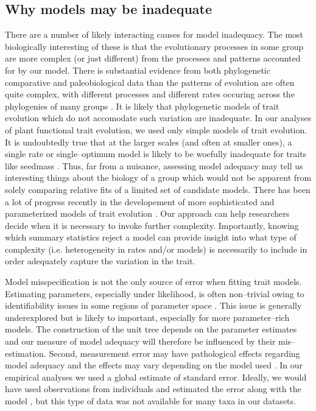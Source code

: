 \documentclass[a4paper,12pt]{article}
\begin{document}
\subsection*{Why models may be inadequate}
There are a number of likely interacting causes for model inadequacy. The most biologically interesting of these is that the evolutionary processes in some group are more complex (or just different) from the processes and patterns accounted for by our model.  There is substantial evidence from both phylogenetic comparative and paleobiological data than the patterns of evolution are often quite complex, with different processes and different rates occuring across the phylogenies of many groups \citep{Foote1997, Grey2008, Hunt2012, Hopkins2012, PennellPE}. It is likely that phylogenetic models of trait evolution which do not accomodate such variation are inadequate. In our analyses of plant functional trait evolution, we used only simple models of trait evolution. It is undoubtedly true that at the larger scales (and often at smaller ones), a single rate or single--optimum model is likely to be woefully inadequate for traits like seedmass \citep{Moles2005}. Thus, far from a nuisance, assessing model adequacy may tell us interesting things about the biology of a group which would not be apparent from solely comparing relative fits of a limited set of candidate models. There has been a lot of progress recently in the developement of more sophisticated and parameterized models of trait evolution \citep{ButlerKing2004, Omeara2006, FitzJohn2010, Eastman2011, Venditti2011, Revell2012, Beaulieu2012}. Our approach can help researchers decide when it is necessary to invoke further complexity. Importantly, knowing which summary statistics reject a model can provide insight into what type of complexity (i.e. heterogeneity in rates and/or models) is necessarily to include in order adequately capture the variation in the trait.

Model misspecification is not the only source of error when fitting trait models. Estimating parameters, especially under likelihood, is often non--trivial owing to identifiability issues in some regions of parameter space \citep{Ane2008, HoAne2012}. This issue is generally underexplored but is likely to important, especially for more parameter--rich models. The construction of the unit tree depends on the parameter estimates and our measure of model adequacy will therefore be influenced by their mis--estimation. Second, measurement error may have pathological effects regarding model adequacy and the effects may vary depending on the model used \citep{PennellPE}. In our empirical analyses we used a global estimate of standard error. Ideally, we would have used observations from individuals and estimated the error along with the model \citep{Ives2007, Felsenstein2008,  Hansen2012}, but this type of data was not available for many taxa in our datasets. 
\end{document}
